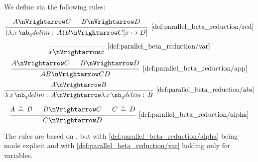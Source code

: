 \begin{definition}\label{def:parallel_beta_reduction}
  We define  via the following rules:

  \begin{equation*}\taglabel[\ensuremath{ \logic{Red}_\Vert }]{def:parallel_beta_reduction/red}
    \begin{prooftree}
      \hypo{ A \pred C }
      \hypo{ B \pred D }
      \infer2[\ref{def:parallel_beta_reduction/red}]{ (\qabs x A)B \pred C[x \mapsto D] }
    \end{prooftree}
  \end{equation*}

  \begin{ThreeColumns}
    \begin{equation*}\taglabel[\ensuremath{ \logic{Var}_\Vert }]{def:parallel_beta_reduction/var}
      \begin{prooftree}
        \infer0[\ref{def:parallel_beta_reduction/var}]{ x \pred x }
      \end{prooftree}
    \end{equation*}
  \BeginSecondColumn
    \begin{equation*}\taglabel[\ensuremath{ \logic{App}_\Vert }]{def:parallel_beta_reduction/app}
      \begin{prooftree}
        \hypo{ A \pred C }
        \hypo{ B \pred D }
        \infer2[\ref{def:parallel_beta_reduction/app}]{ AB \pred CD }
      \end{prooftree}
    \end{equation*}
  \BeginThirdColumn
    \begin{equation*}\taglabel[\ensuremath{ \logic{Abs}_\Vert }]{def:parallel_beta_reduction/abs}
      \begin{prooftree}
        \hypo{ A \pred B }
        \infer1[\ref{def:parallel_beta_reduction/abs}]{ \qabs x A \pred \qabs x B }
      \end{prooftree}
    \end{equation*}
  \end{ThreeColumns}

  \begin{equation*}\taglabel[\ensuremath{ \logic{Alpha}_\Vert }]{def:parallel_beta_reduction/alpha}
    \begin{prooftree}
      \hypo{ A \aequiv B }
      \hypo{ B \pred C }
      \hypo{ C \aequiv D }
      \infer3[\ref{def:parallel_beta_reduction/alpha}]{ C \pred D }
    \end{prooftree}
  \end{equation*}
\end{definition}
\begin{comments}
  \item The rules are based on \cite[3.2.3]{Barendregt1984}, but with \ref{def:parallel_beta_reduction/alpha} being made explicit and with \ref{def:parallel_beta_reduction/var} holding only for variables.
\end{comments}

